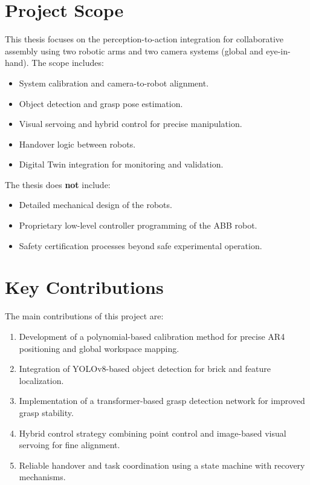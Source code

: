 \section{Project Scope}
This thesis focuses on the perception-to-action integration for collaborative assembly using two robotic arms and two camera systems (global and eye-in-hand). The scope includes:
\begin{itemize}
    \item System calibration and camera-to-robot alignment.
    \item Object detection and grasp pose estimation.
    \item Visual servoing and hybrid control for precise manipulation.
    \item Handover logic between robots.
    \item Digital Twin integration for monitoring and validation.
\end{itemize}

The thesis does \textbf{not} include:
\begin{itemize}
    \item Detailed mechanical design of the robots.
    \item Proprietary low-level controller programming of the ABB robot.
    \item Safety certification processes beyond safe experimental operation.
\end{itemize}

\section{Key Contributions}
The main contributions of this project are:
\begin{enumerate}
    \item Development of a polynomial-based calibration method for precise AR4 positioning and global workspace mapping.
    \item Integration of YOLOv8-based object detection for brick and feature localization.
    \item Implementation of a transformer-based grasp detection network for improved grasp stability.
    \item Hybrid control strategy combining point control and image-based visual servoing for fine alignment.
    \item Reliable handover and task coordination using a state machine with recovery mechanisms.
\end{enumerate}

